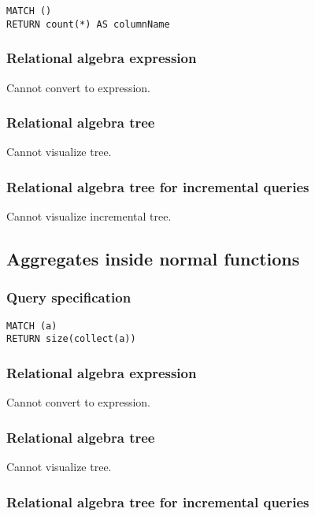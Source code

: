 \begin{lstlisting}
MATCH ()
RETURN count(*) AS columnName
\end{lstlisting}

\subsubsection*{Relational algebra expression}

Cannot convert to expression.

\subsubsection*{Relational algebra tree}

Cannot visualize tree.

\subsubsection*{Relational algebra tree for incremental queries}

Cannot visualize incremental tree.

\subsection{Aggregates inside normal functions}

\subsubsection*{Query specification}

\begin{lstlisting}
MATCH (a)
RETURN size(collect(a))
\end{lstlisting}

\subsubsection*{Relational algebra expression}

Cannot convert to expression.

\subsubsection*{Relational algebra tree}

Cannot visualize tree.

\subsubsection*{Relational algebra tree for incremental queries}

